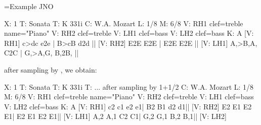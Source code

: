 \documentclass{article}
\begin{document}
=Example JNO


\medskip

\begin{_abc}[incipit,mp3,width=0.9\textwidth]
X: 1 
T: Sonata
T: K 331i
C: W.A. Mozart
L: 1/8
M: 6/8
V: RH1 clef=treble name="Piano" 
V: RH2 clef=treble 
V: LH1 clef=bass 
V: LH2 clef=bass 
K: A
[V: RH1] c>dc e2e | B>cB d2d ||
[V: RH2] E2E E2E | E2E E2E ||
[V: LH1] A,>B,A, C2C | G,>A,G, B,2B, ||
\end{_abc}

after sampling by
, we obtain:

\begin{_abc}[wav,width=0.9\textwidth]
X: 1
T: Sonata
T: K 331i
T: ... after sampling by 1+1/2
C: W.A. Mozart
L: 1/8
M: 6/8
V: RH1 clef=treble name="Piano" 
V: RH2 clef=treble 
V: LH1 clef=bass 
V: LH2 clef=bass 
K: A
% 
[V: RH1] c2 c1 e2 e1| B2 B1 d2 d1||
[V: RH2] E2 E1 E2 E1| E2 E1 E2 E1||
[V: LH1] A,2 A,1 C2 C1| G,2 G,1 B,2 B,1||
[V: LH2] 

\end{_abc}
\end{document}
